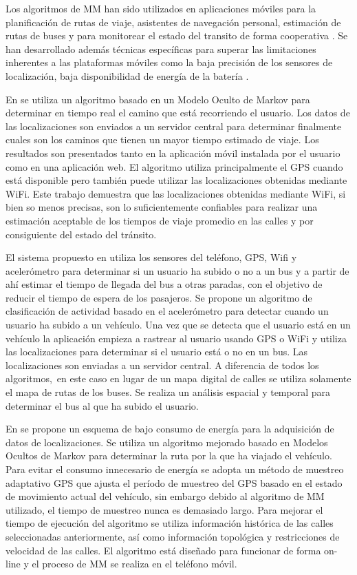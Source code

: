 Los algoritmos de MM han sido utilizados en aplicaciones móviles para la planificación de rutas de viaje, asistentes de navegación personal, estimación de rutas de buses y para monitorear el estado del transito de forma cooperativa \cite{thiagarajan2010cooperative, thiagarajan2009vtrack}. Se han desarrollado además técnicas específicas para superar las limitaciones inherentes a las plataformas móviles como la baja precisión de los sensores de localización, baja disponibilidad de energía de la batería \cite{thiagarajan2011accurate, fang2011enacq}.

En \cite{thiagarajan2009vtrack} se utiliza un algoritmo basado en un Modelo Oculto de Markov para determinar en tiempo real el camino que está recorriendo el usuario. Los datos de las localizaciones son enviados a un servidor central para determinar finalmente cuales son los caminos que tienen un mayor tiempo estimado de viaje. Los resultados son presentados tanto en la aplicación móvil instalada por el usuario como en una aplicación web. El algoritmo utiliza principalmente el GPS cuando está disponible pero también puede utilizar las localizaciones obtenidas mediante WiFi. Este trabajo demuestra que las localizaciones obtenidas mediante WiFi, si bien so menos precisas, son lo suficientemente confiables para realizar una estimación aceptable de los tiempos de viaje promedio en las calles y por consiguiente del estado del tránsito.

El sistema propuesto en \cite{thiagarajan2010cooperative} utiliza los sensores del teléfono, GPS, Wifi y acelerómetro para determinar si un usuario ha subido o no a un bus y a partir de ahí estimar el tiempo de llegada del bus a otras paradas, con el objetivo de reducir el tiempo de espera de los pasajeros. Se propone un algoritmo de clasificación de actividad basado en el acelerómetro para detectar cuando un usuario ha subido a un vehículo. Una vez que se detecta que el usuario está en un vehículo la aplicación empieza a rastrear al usuario usando GPS o WiFi y utiliza las localizaciones para determinar si el usuario está o no en un bus. Las localizaciones son enviadas a un servidor central. A diferencia de todos los algoritmos,\ en este caso en lugar de un mapa digital de calles se utiliza solamente el mapa de rutas de los buses. Se realiza un análisis espacial y temporal para determinar el bus al que ha subido el usuario.

En \cite{fang2011enacq} se propone un esquema de bajo consumo de energía para la adquisición de datos de localizaciones. Se utiliza un algoritmo mejorado basado en Modelos Ocultos de Markov para determinar la ruta por la que ha viajado el vehículo. Para evitar el consumo innecesario de energía se adopta un método de muestreo adaptativo GPS que ajusta el período de muestreo del GPS basado en el estado de movimiento actual del vehículo, sin embargo debido al algoritmo de MM utilizado, el tiempo de muestreo nunca es demasiado largo. Para mejorar el tiempo de ejecución del algoritmo se utiliza información histórica de las calles seleccionadas anteriormente, así como información topológica y restricciones de velocidad de las calles. El algoritmo está diseñado para funcionar de forma on-line y el proceso de MM se realiza en el teléfono móvil.

